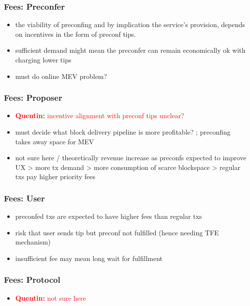 \documentclass[a4paper]{article}
\theoremstyle{boldstyle}
\newcommand{\qb}[1]{\textcolor{red}{\textbf{Quentin:} #1}}
\begin{document}
    \subsubsection{Fees: Preconfer}
        \begin{itemize}
            \item the viability of preconfing and by implication the service's provision, depends on incentives in the form of preconf tips. 
            \item sufficient demand might mean the preconfer can remain economically ok with charging lower tips
            \item must do online MEV problem?  
        \end{itemize}
    
    \subsubsection{Fees: Proposer}
        \begin{itemize}
            \item \qb{incentive alignment with preconf tips unclear?}
            \item must decide what block delivery pipeline is more profitable? ; preconfing takes away space for MEV 
            \item not sure here / theoretically revenue increase as preconfs expected to improve UX > more tx demand > more consumption of scarce blockspace > regular txs pay higher priority fees
        \end{itemize}
    
    \subsubsection{Fees: User}  
        \begin{itemize}
            \item preconfed txs are expected to have higher fees than regular txs 
            \item risk that user sends tip but preconf not fulfilled (hence needing TFE mechanism)
            \item insufficient fee may mean long wait for fulfillment 
        \end{itemize}
    
    \subsubsection{Fees: Protocol} 
        \begin{itemize}
            \item \qb{not sure here}
        \end{itemize}
    
\end{document}
